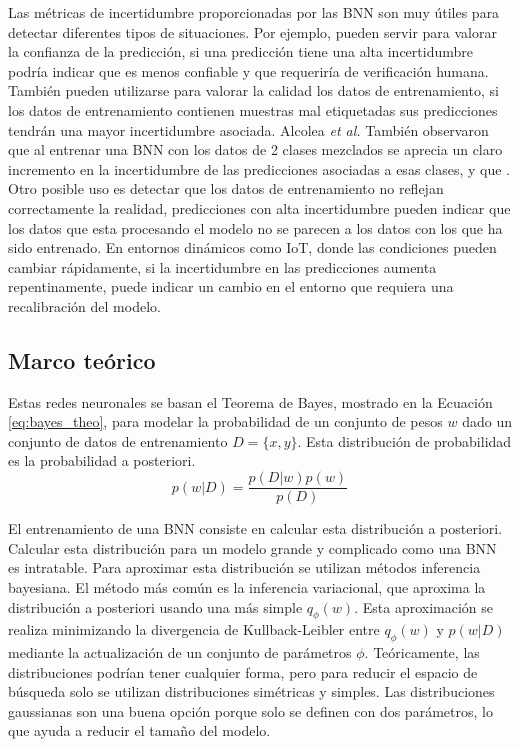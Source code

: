 Las métricas de incertidumbre proporcionadas por las BNN son muy útiles para detectar diferentes tipos de situaciones. Por ejemplo, pueden servir para valorar la confianza de la predicción, si una predicción tiene una alta incertidumbre podría indicar que es menos confiable y que requeriría de verificación humana. También pueden utilizarse para valorar la calidad los datos de entrenamiento, si los datos de entrenamiento contienen muestras mal etiquetadas sus predicciones tendrán una mayor incertidumbre asociada. Alcolea \emph{et al.} \cite{bnn_hyper_uncertainty}  También observaron que al entrenar una BNN con los datos de 2 clases mezclados se aprecia un claro incremento en la incertidumbre de las predicciones asociadas a esas clases, y que . Otro posible uso es detectar que los datos de entrenamiento no reflejan correctamente la realidad, predicciones con alta incertidumbre pueden indicar que los datos que esta procesando el modelo no se parecen a los datos con los que ha sido entrenado. En entornos dinámicos como IoT, donde las condiciones pueden cambiar rápidamente, si la incertidumbre en las predicciones aumenta repentinamente, puede indicar un cambio en el entorno que requiera una recalibración del modelo.

\subsection{Marco teórico} \label{sec:bnn_formulas}

Estas redes neuronales se basan el Teorema de Bayes,  mostrado en la Ecuación \ref{eq:bayes_theo}, para modelar la probabilidad de un conjunto de pesos $w$ dado un conjunto de datos de entrenamiento $D = \{x, y\}$. Esta distribución de probabilidad es la probabilidad a posteriori.
\begin{equation} \label{eq:bayes_theo}
p(w|D) = \dfrac{p(D|w) p(w)}{p(D)}
\end{equation}

El entrenamiento de una BNN consiste en calcular esta distribución a posteriori. Calcular esta distribución para un modelo grande y complicado como una BNN es intratable. Para aproximar esta distribución se utilizan métodos inferencia bayesiana. El método más común es la inferencia variacional, que aproxima la distribución a posteriori usando una más simple $q_{\phi}(w)$. Esta aproximación se realiza minimizando la divergencia de Kullback-Leibler \cite{kl_divergence} entre $q_{\phi}(w)$ y $p(w|D)$ mediante la actualización de un conjunto de parámetros $\phi$. Teóricamente, las distribuciones podrían tener cualquier forma, pero para reducir el espacio de búsqueda solo se utilizan distribuciones simétricas y simples. Las distribuciones gaussianas son una buena opción porque solo se definen con dos parámetros, lo que ayuda a reducir el tamaño del modelo.

